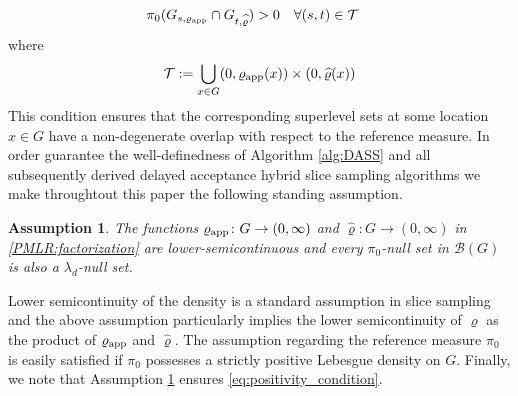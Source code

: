\documentclass[sn-mathphys-num]{sn-jnl}%
\theoremstyle{thmstyleone}%
\theoremstyle{thmstyletwo}%
\theoremstyle{thmstylethree}%
\newtheorem{assumption}{Assumption}%
\newcommand{\rhoapp}{\varrho_{{\rm app}}}
\newcommand{\rhohat}{\widehat{\varrho}}
\newcommand{\change}[1]{\bgroup\color{black}#1\egroup}    %
\begin{document}
\change{
\begin{align}\label{eq:positivity_condition}
    \pi_0(G_{s,\rhoapp} \cap G_{t,\widehat{\varrho}}) & > 0& & \forall 
    (s,t)\in \mathcal T
\end{align}
where
\[
    \mathcal T 
    := 
    \bigcup_{x\in G} (0,\rhoapp(x)) \times (0,\widehat{\varrho}(x))
\]
This condition ensures that the corresponding superlevel sets at some location $x\in G$ have a non-degenerate overlap with respect to the reference measure. In order guarantee the well-definedness of Algorithm \ref{alg:DASS} and all subsequently derived delayed acceptance hybrid slice sampling algorithms we make throughtout this paper the following standing assumption.
\begin{assumption}\label{assum:positivity_condition}
The functions $\rhoapp\colon G\to(0,\infty)$ and $\rhohat\colon G\to(0,\infty)$ in \eqref{PMLR:factorization} are lower-semicontinuous and every $\pi_0$-null set in $\mathcal B(G)$ is also a $\lambda_d$-null set. 
\end{assumption}

Lower semicontinuity of the density is a standard assumption in slice sampling and the above assumption particularly implies the lower semicontinuity of $\varrho$ as the product of $\rhoapp$ and $\rhohat$. The assumption regarding the reference measure $\pi_0$ is easily satisfied if $\pi_0$ possesses a strictly positive Lebesgue density on $G$. 
Finally, we note that Assumption \ref{assum:positivity_condition} ensures \eqref{eq:positivity_condition}.
}
\end{document}
